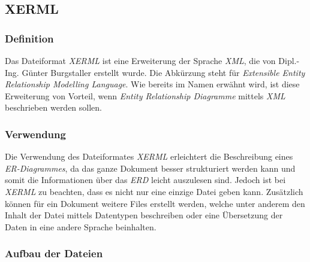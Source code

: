 \subsection{XERML}

\subsubsection{Definition}

\noindent
Das Dateiformat \textit{XERML} ist eine Erweiterung der Sprache \textit{XML}, die von Dipl.-Ing. Günter Burgstaller erstellt wurde. Die Abkürzung steht für \textit{Extensible Entity Relationship Modelling Language}. Wie bereits im Namen erwähnt wird, ist diese Erweiterung von Vorteil, wenn \textit{Entity Relationship Diagramme} mittels \textit{XML} beschrieben werden sollen. 

\subsubsection{Verwendung}
\noindent
Die Verwendung des Dateiformates \textit{XERML} erleichtert die Beschreibung eines \textit{ER-Diagrammes}, da das ganze Dokument besser strukturiert werden kann und somit die Informationen über das \textit{ERD} leicht auszulesen sind. Jedoch ist bei \textit{XERML} zu beachten, dass es nicht nur eine einzige Datei geben kann. Zusätzlich können für ein Dokument weitere Files erstellt werden, welche unter anderem den Inhalt der Datei mittels Datentypen beschreiben oder eine Übersetzung der Daten in eine andere Sprache beinhalten.
\pra
\subsubsection{Aufbau der Dateien}

